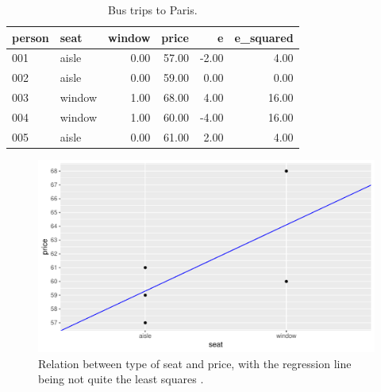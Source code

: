 \documentclass[]{book}\usepackage[]{graphicx}\usepackage[]{color}
\makeatletter
\def\maxwidth{ %
  \ifdim\Gin@nat@width>\linewidth
    \linewidth
  \else
    \Gin@nat@width
  \fi
}
\newenvironment{knitrout}{}{} %
\makeatother
\begin{document}
\begin{table}[ht]
\centering
\caption{Bus trips to Paris.} 
\label{tab:dummy_5}
\begin{tabular}{llrrrr}
  \hline
person & seat & window & price & e & e\_squared \\ 
  \hline
001 & aisle & 0.00 & 57.00 & -2.00 & 4.00 \\ 
  002 & aisle & 0.00 & 59.00 & 0.00 & 0.00 \\ 
  003 & window & 1.00 & 68.00 & 4.00 & 16.00 \\ 
  004 & window & 1.00 & 60.00 & -4.00 & 16.00 \\ 
  005 & aisle & 0.00 & 61.00 & 2.00 & 4.00 \\ 
   \hline
\end{tabular}
\end{table}




\begin{knitrout}
\color{fgcolor}\begin{figure}

{\centering \includegraphics[width=\maxwidth]{figure/dummy_6-1} 

}

\caption[Relation between type of seat and price, with the regression line being not quite the least squares ]{Relation between type of seat and price, with the regression line being not quite the least squares .}\label{fig:dummy_6}
\end{figure}


\end{knitrout}
\end{document}
